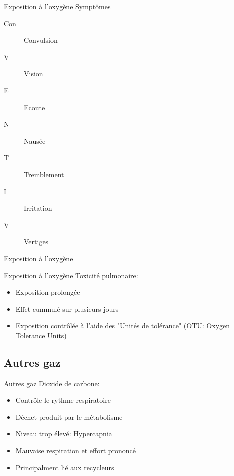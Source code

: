 	\begin{frame}{Exposition à l'oxygène}
		Symptômes
		\begin{description}
			\item[Con]Convulsion
			\item[V]Vision
			\item[E]Ecoute
			\item[N]Nausée
			\item[T]Tremblement
			\item[I]Irritation
			\item[V]Vertiges
		\end{description}
	\end{frame}

	\begin{frame}{Exposition à l'oxygène}  
	\end{frame}

	\begin{frame}{Exposition à l'oxygène}
		Toxicité pulmonaire:
		\begin{itemize}
			\item Exposition prolongée
			\item Effet cummulé sur plusieurs jours
			\item Exposition contrôlée à l'aide des "Unités  de tolérance" (OTU: Oxygen Tolerance Units)
		\end{itemize}
	\end{frame}

\subsection{Autres gaz}
	\begin{frame}{Autres gaz}  
		Dioxide de carbone:
		\begin{itemize}
			\item Contrôle le rythme respiratoire
			\item Déchet produit par le métabolisme
			\item Niveau trop élevé: Hypercapnia
			\item Mauvaise respiration et effort prononcé
			\item Principalment lié aux recycleurs
		\end{itemize}
	\end{frame}

